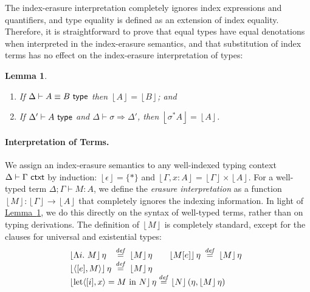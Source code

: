 \documentclass{sigplanconf}
\newcommand{\isType}{\textup{\textsf{ type}}}
\newcommand{\isCtxt}{\textup{\textsf{ ctxt}}}
\newcommand{\tySem}[1]{\left\lfloor #1 \right\rfloor}
\newcommand{\ctxtSem}[1]{\left\lfloor #1 \right\rfloor}
\newcommand{\tmSem}[1]{\left\lfloor{#1}\right\rfloor}
\newtheorem{lemma}{Lemma}
\newcommand{\lemref}[1]{\hyperref[#1]{Lemma~\ref*{#1}}}
\newcommand{\isDefinedAs}{\stackrel{\mathit{def}}=}
\theoremstyle{examplestyle}
\theoremstyle{restatementstyle}
\begin{document}
The index-erasure interpretation completely ignores index expressions
and quantifiers, and type equality is defined as an extension of index
equality. Therefore, it is straightforward to prove that equal types
have equal denotations when interpreted in the index-erasure
semantics, and that substitution of index terms has no effect on the
index-erasure interpretation of types:
\begin{lemma}\label{lem:tyeqsubst-erasure}
  \begin{enumerate}
  \item If $\Delta \vdash A \equiv B \isType$ then $\tySem{A} =
    \tySem{B}$; and
  \item If $\Delta' \vdash A \isType$ and $\Delta \vdash \sigma
    \Rightarrow \Delta'$, then $\tySem{\sigma^*A} = \tySem{A}$.
  \end{enumerate}
\end{lemma}

\paragraph{Interpretation of Terms.}


We assign an index-erasure semantics to any well-indexed typing
context $\Delta \vdash \Gamma \isCtxt$ by induction:
$\ctxtSem{\epsilon} = \{*\}$ and $\ctxtSem{\Gamma, x : A} =
\ctxtSem{\Gamma} \times \tySem{A}$. For a well-typed term $\Delta;
\Gamma \vdash M : A$, we define the \emph{erasure interpretation} as a
function $\tmSem{M} : \ctxtSem{\Gamma} \to \tySem{A}$ that completely
ignores the indexing information. In light of
\lemref{lem:tyeqsubst-erasure}, we do this %
directly on the syntax of well-typed terms, rather than on typing
derivations. The definition of $\tmSem{M}$ is completely standard,
except for the clauses for universal and existential types:
\begin{displaymath}
  \begin{array}{@{}l}
    \begin{array}{@{}l@{\hspace{0.5em}}c@{\hspace{0.5em}}l@{\hspace{2em}}l@{\hspace{0.5em}}c@{\hspace{0.5em}}l@{}}
      \tmSem{\Lambda i.\ M}\eta & \isDefinedAs & \tmSem{M}\eta
      &
      \tmSem{M[e]}\eta & \isDefinedAs & \tmSem{M}\eta \\
      \tmSem{\langle [e], M\rangle}\eta & \isDefinedAs & \tmSem{M}\eta
    \end{array} \\
    \tmSem{\mathrm{let}\langle[i], x\rangle = M\ \mathrm{in}\ N}\eta \isDefinedAs \tmSem{N}(\eta, \tmSem{M}\eta)
  \end{array}
\end{displaymath}
\end{document}

